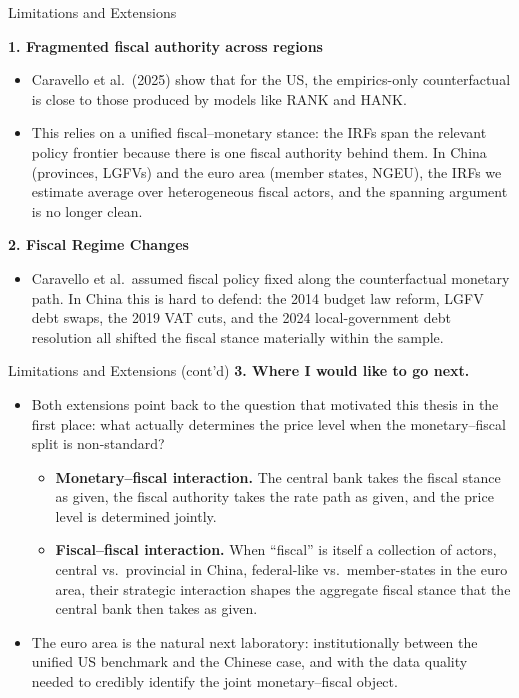 \documentclass[10pt,aspectratio=169,t]{beamer}
\begin{document}
\begin{frame}{Limitations and Extensions}

\textbf{1. Fragmented fiscal authority across regions}
\begin{itemize}\itemsep0.1em
  \item Caravello et al.\ (2025) show that for the US, the empirics-only
        counterfactual is close to those produced by models like RANK and HANK.
  \item This relies on a unified fiscal--monetary stance: the IRFs span the
        relevant policy frontier because there is one fiscal authority behind
        them. In China (provinces, LGFVs) and the euro area (member states,
        NGEU), the IRFs we estimate average over heterogeneous fiscal
        actors, and the spanning argument is no longer clean.
\end{itemize}

\textbf{2. Fiscal Regime Changes}
\begin{itemize}\itemsep0.1em
  \item Caravello et al.\ assumed fiscal policy fixed along the counterfactual
        monetary path. In China this is hard to defend: the 2014 budget law
        reform, LGFV debt swaps, the 2019 VAT cuts, and the 2024 local-government
        debt resolution all shifted the fiscal stance materially within the sample.
\end{itemize}
\end{frame}
\begin{frame}{Limitations and Extensions (cont'd)}
\vspace{0.2em}
\textbf{3. Where I would like to go next.}
\begin{itemize}\itemsep0.1em
  \item Both extensions point back to the question that motivated this thesis
        in the first place: what actually determines the price level
        when the monetary--fiscal split is non-standard?
      \vspace{0.3em}\\

\begin{itemize}
  \item[$\bullet$] \textbf{Monetary--fiscal interaction.}  The central bank takes the fiscal stance as given, the fiscal
        authority takes the rate path as given, and the price level is
        determined jointly.
  \item[$\bullet$] \textbf{Fiscal--fiscal interaction.}  When ``fiscal'' is itself a collection of
        actors, central vs.\ provincial in China, federal-like vs.\
        member-states in the euro area, their strategic interaction shapes
        the aggregate fiscal stance that the central bank then takes as given.
\end{itemize}
  \item The euro area is the natural next laboratory: institutionally between
        the unified US benchmark and the Chinese case, and with the data
        quality needed to credibly identify the joint monetary--fiscal object.
\end{itemize}

\end{frame}
\end{document}
